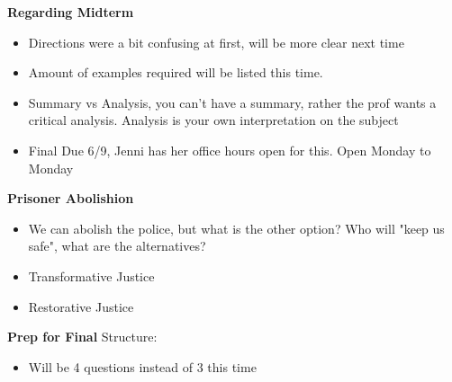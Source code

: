 \documentclass{article}
\begin{document}
\noindent \textbf{Regarding Midterm}
\begin{itemize}
  \item Directions were a bit confusing at first,
    will be more clear next time
  \item Amount of examples required will be listed this time.
  \item Summary vs Analysis, you can't have a summary, rather the prof
    wants a critical analysis.
    Analysis is your own interpretation on the subject
  \item Final Due 6/9, Jenni has her office hours open for this.
    Open Monday to Monday
\end{itemize}

\noindent \textbf{Prisoner Abolishion}
\begin{itemize}
  \item We can abolish the police, but what is the other option?
    Who will "keep us safe", what are the alternatives?
  \item Transformative Justice
  \item Restorative Justice
\end{itemize}

\noindent \textbf{Prep for Final}
Structure:
\begin{itemize}
  \item Will be 4 questions instead of 3 this time
\end{itemize}
\end{document}
